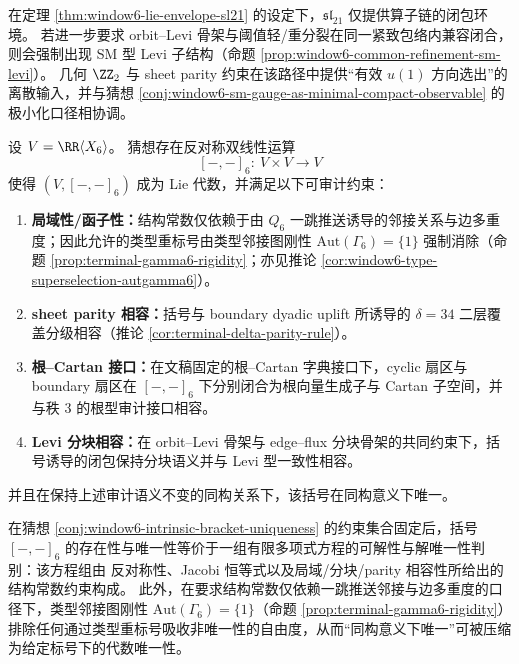 \begin{remark}[从抽象括号到残余代数的约束性读出]\label{rem:window6-bracket-to-sm-residual}
在定理 \ref{thm:window6-lie-envelope-sl21} 的设定下，\(\mathfrak{sl}_{21}\) 仅提供算子链的闭包环境。
若进一步要求 orbit--Levi 骨架与阈值轻/重分裂在同一紧致包络内兼容闭合，则会强制出现 SM 型 Levi 子结构（命题 \ref{prop:window6-common-refinement-sm-levi}）。
几何 \(\ZZ_2\) 与 sheet parity 约束在该路径中提供“有效 \(u(1)\) 方向选出”的离散输入，并与猜想 \ref{conj:window6-sm-gauge-as-minimal-compact-observable} 的极小化口径相协调。
\end{remark}

\begin{conjecture}\label{conj:window6-intrinsic-bracket-uniqueness}
设 \(V=\RR\langle X_6\rangle\)。
猜想存在反对称双线性运算
\[
[-,-]_6:\ V\times V\to V
\]
使得 \((V,[-,-]_6)\) 成为 Lie 代数，并满足以下可审计约束：
\begin{enumerate}
  \item \textbf{局域性/函子性：}结构常数仅依赖于由 \(Q_6\) 一跳推送诱导的邻接关系与边多重度；因此允许的类型重标号由类型邻接图刚性 \(\mathrm{Aut}(\Gamma_6)=\{1\}\) 强制消除（命题 \ref{prop:terminal-gamma6-rigidity}；亦见推论 \ref{cor:window6-type-superselection-autgamma6}）。
  \item \textbf{sheet parity 相容：}括号与 boundary dyadic uplift 所诱导的 \(\delta=34\) 二层覆盖分级相容（推论 \ref{cor:terminal-delta-parity-rule}）。
  \item \textbf{根--Cartan 接口：}在文稿固定的根--Cartan 字典接口下，cyclic 扇区与 boundary 扇区在 \([-,-]_6\) 下分别闭合为根向量生成子与 Cartan 子空间，并与秩 \(3\) 的根型审计接口相容。
  \item \textbf{Levi 分块相容：}在 orbit--Levi 骨架与 edge--flux 分块骨架的共同约束下，括号诱导的闭包保持分块语义并与 Levi 型一致性相容。
\end{enumerate}
并且在保持上述审计语义不变的同构关系下，该括号在同构意义下唯一。
\end{conjecture}

\begin{proposition}\label{prop:window6-bracket-certificate-reduction}
在猜想 \ref{conj:window6-intrinsic-bracket-uniqueness} 的约束集合固定后，括号 \([-,-]_6\) 的存在性与唯一性等价于一组有限多项式方程的可解性与解唯一性判别：该方程组由
反对称性、Jacobi 恒等式以及局域/分块/parity 相容性所给出的结构常数约束构成。
此外，在要求结构常数仅依赖一跳推送邻接与边多重度的口径下，类型邻接图刚性 \(\mathrm{Aut}(\Gamma_6)=\{1\}\)（命题 \ref{prop:terminal-gamma6-rigidity}）排除任何通过类型重标号吸收非唯一性的自由度，从而“同构意义下唯一”可被压缩为给定标号下的代数唯一性。
\end{proposition}

